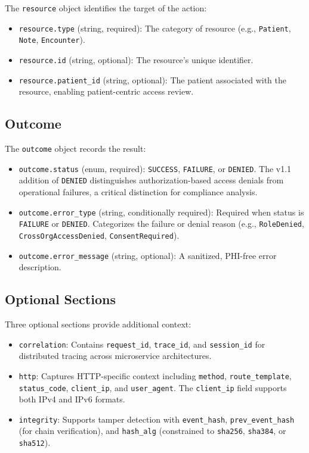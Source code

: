 \documentclass[11pt,a4paper]{article}
\begin{document}
The \texttt{resource} object identifies the target of the action:

\begin{itemize}
    \item \texttt{resource.type} (string, required): The category of resource (e.g., \texttt{Patient}, \texttt{Note}, \texttt{Encounter}).
    \item \texttt{resource.id} (string, optional): The resource's unique identifier.
    \item \texttt{resource.patient\_id} (string, optional): The patient associated with the resource, enabling patient-centric access review.
\end{itemize}

\subsection{Outcome}

The \texttt{outcome} object records the result:

\begin{itemize}
    \item \texttt{outcome.status} (enum, required): \texttt{SUCCESS}, \texttt{FAILURE}, or \texttt{DENIED}. The v1.1 addition of \texttt{DENIED} distinguishes authorization-based access denials from operational failures, a critical distinction for compliance analysis.
    \item \texttt{outcome.error\_type} (string, conditionally required): Required when status is \texttt{FAILURE} or \texttt{DENIED}. Categorizes the failure or denial reason (e.g., \texttt{RoleDenied}, \texttt{CrossOrgAccessDenied}, \texttt{ConsentRequired}).
    \item \texttt{outcome.error\_message} (string, optional): A sanitized, PHI-free error description.
\end{itemize}

\subsection{Optional Sections}

Three optional sections provide additional context:

\begin{itemize}
    \item \texttt{correlation}: Contains \texttt{request\_id}, \texttt{trace\_id}, and \texttt{session\_id} for distributed tracing across microservice architectures.
    \item \texttt{http}: Captures HTTP-specific context including \texttt{method}, \texttt{route\_template}, \texttt{status\_code}, \texttt{client\_ip}, and \texttt{user\_agent}. The \texttt{client\_ip} field supports both IPv4 and IPv6 formats.
    \item \texttt{integrity}: Supports tamper detection with \texttt{event\_hash}, \texttt{prev\_event\_hash} (for chain verification), and \texttt{hash\_alg} (constrained to \texttt{sha256}, \texttt{sha384}, or \texttt{sha512}).
\end{itemize}
\end{document}
